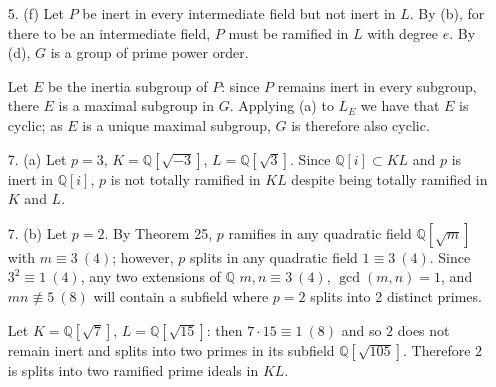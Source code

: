 \documentclass{article}
\newcommand{\Q}[0]{\mathbb{Q}}
\newcommand{\Z}[0]{\mathbb{Z}}
\newcommand{\modequiv}[3]{#1 \equiv #2\ (#3)}
\newcommand{\modnotequiv}[3]{#1 \not\equiv #2\ (#3)}
\begin{document}
\begin{enumerate}
    {\bf An example over $\Q$:} Let $L$ be the cyclotomic field $\Q[\zeta_5]$.  The Galois group of $L$ has order 4 and is cyclic with generator $\sigma$.

    Let $p = 19$; $\modequiv{19}{-1}{5}$ so $\modequiv{19^2}{1}{5}$ and so 19 has multiplicative order 2 mod 5.  By Theorem 26, its inertial degree in $\Z[\zeta_5]$ is 2 and as $\gcd(5, 19) = 1$, its ramification index is 1; since $ref = 4$, 19 must split into 2 primes in $\Z[\zeta_5]$.

    Because there are 2 primes lying over 19 in $\Z[\zeta_5]$, and $\sigma$ generates the Galois group, $\sigma$ must permute the primes lying over 19, meaning its decomposition group $D = \{e, \sigma^2\}$.  This is a normal subgroup in $G$ and so Corollary 2 to Theorem 28 applies.

    As there are no other subgroups of $G$, 19 splits completely in every proper subfield of $\Q[\zeta_5]$ but not in $\Q[\zeta_5]$, where it has inertial degree 2.

    \item [5. (f)]  Let $P$ be inert in every intermediate field but not inert in $L$.  By (b), for there to be an intermediate field, $P$ must be ramified in $L$ with degree $e$.  By (d), $G$ is a group of prime power order.

    Let $E$ be the inertia subgroup of $P$: since $P$ remains inert in every subgroup, there $E$ is a maximal subgroup in $G$.  Applying (a) to $L_{E}$ we have that $E$ is cyclic; as $E$ is a unique maximal subgroup, $G$ is therefore also cyclic.

    \item[7. (a)] Let $p = 3$, $K = \Q[\sqrt{-3}]$, $L = \Q[\sqrt{3}]$.  Since $\Q[i] \subset KL$ and $p$ is inert in $\Q[i]$, $p$ is not totally ramified in $KL$ despite being totally ramified in $K$ and $L$.

    \item[7. (b)] Let $p = 2$.  By Theorem 25, $p$ ramifies in any quadratic field $\Q[\sqrt{m}]$ with $\modequiv{m}{3}{4}$; however, $p$ splits in any quadratic field $\modequiv{1}{3}{4}$.  Since $\modequiv{3^2}{1}{4}$, any two extensions of $\Q$ $\modequiv{m, n}{3}{4}$, $\gcd(m, n) = 1$, and $\modnotequiv{mn}{5}{8}$ will contain a subfield where $p = 2$ splits into 2 distinct primes.

    Let $K = \Q[\sqrt{7}]$, $L = \Q[\sqrt{15}]$: then $\modequiv{7 \cdot 15}{1}{8}$ and so $2$ does not remain inert and splits into two primes in its subfield $\Q[\sqrt{105}]$.  Therefore $2$ is splits into two ramified prime ideals in $KL$.


\end{enumerate}
\end{document}
